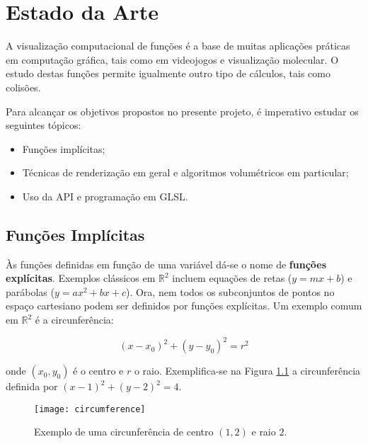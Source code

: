 \chapter{Estado da Arte}
\label{ch::arte}


A visualização computacional de funções é a base de muitas aplicações práticas em computação gráfica, tais como em videojogos e visualização molecular. O estudo destas funções permite igualmente outro tipo de cálculos, tais como colisões.

Para alcançar os objetivos propostos no presente projeto, é imperativo estudar os seguintes tópicos:

\begin{itemize}[nosep]
	\item Funções implícitas;
	\item Técnicas de renderização em geral e algoritmos volumétricos em particular;
	\item Uso da \ac{API} \opengl e programação em \ac{GLSL}.
\end{itemize}


\section{Funções Implícitas}
\label{sec::arte:implicitas}

Às funções definidas em função de uma variável dá-se o nome de \textbf{funções explícitas}. Exemplos clássicos em $\mathbb{R}^2$ incluem equações de retas ($y = mx + b$) e parábolas ($y = ax^2 + bx + c$). Ora, nem todos os subconjuntos de pontos no espaço cartesiano podem ser definidos por funções explícitas. Um exemplo comum em $\mathbb{R}^2$ é a circunferência:

\begin{equation}
	(x - x_0)^2 + (y - y_0)^2 = r^2
	\label{eq::circ_implicita}
\end{equation}

onde $(x_0, y_0)$ é o centro e $r$ o raio. Exemplifica-se na Figura \ref{fig::circumference} a circunferência definida por $(x - 1)^2 + (y - 2)^2 = 4$.

\begin{figure}[!btp]
	\centering
	\texttt{[image: circumference]}
	\caption[Exemplo de uma circunferência]{Exemplo de uma circunferência de centro $(1, 2)$ e raio $2$.}
	\label{fig::circumference}
\end{figure}

